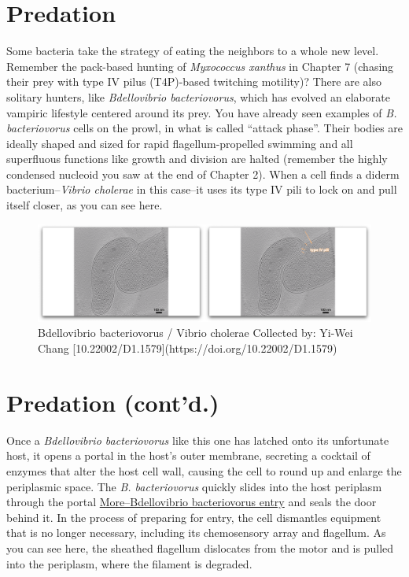 \documentclass[]{tufte-book}
\begin{document}
\section{Predation}\label{predation}

Some bacteria take the strategy of eating the neighbors to a whole new
level. Remember the pack-based hunting of \emph{Myxococcus xanthus} in
Chapter 7 (chasing their prey with type IV pilus (T4P)-based twitching
motility)? There are also solitary hunters, like \emph{Bdellovibrio
bacteriovorus}, which has evolved an elaborate vampiric lifestyle
centered around its prey. You have already seen examples of \emph{B.
bacteriovorus} cells on the prowl, in what is called ``attack phase''.
Their bodies are ideally shaped and sized for rapid flagellum-propelled
swimming and all superfluous functions like growth and division are
halted (remember the highly condensed nucleoid you saw at the end of
Chapter 2). When a cell finds a diderm bacterium--\emph{Vibrio cholerae}
in this case--it uses its type IV pili to lock on and pull itself
closer, as you can see here.

\begin{figure}
\includegraphics{movie_stills/9_9} \caption[Bdellovibrio bacteriovorus / Vibrio cholerae Collected by]{Bdellovibrio bacteriovorus / Vibrio cholerae Collected by: Yi-Wei Chang [10.22002/D1.1579](https://doi.org/10.22002/D1.1579)}\label{fig:unnamed-chunk-169}
\end{figure}

\section{Predation (cont'd.)}\label{predation-contd.}

Once a \emph{Bdellovibrio bacteriovorus} like this one has latched onto
its unfortunate host, it opens a portal in the host's outer membrane,
secreting a cocktail of enzymes that alter the host cell wall, causing
the cell to round up and enlarge the periplasmic space. The \emph{B.
bacteriovorus} quickly slides into the host periplasm through the portal
\protect\hyperlink{morebdellovibrio-bacteriovorus-entry}{More--Bdellovibrio
bacteriovorus entry} and seals the door behind it. In the process of
preparing for entry, the cell dismantles equipment that is no longer
necessary, including its chemosensory array and flagellum. As you can
see here, the sheathed flagellum dislocates from the motor and is pulled
into the periplasm, where the filament is degraded.
\end{document}
